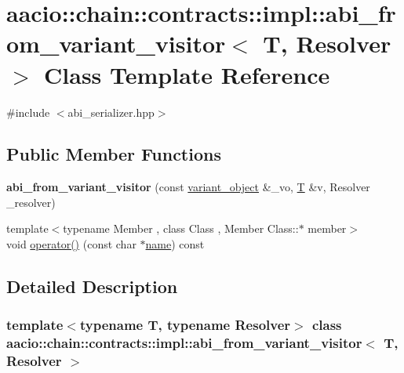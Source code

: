 \hypertarget{classaacio_1_1chain_1_1contracts_1_1impl_1_1abi__from__variant__visitor}{}\section{aacio\+:\+:chain\+:\+:contracts\+:\+:impl\+:\+:abi\+\_\+from\+\_\+variant\+\_\+visitor$<$ T, Resolver $>$ Class Template Reference}
\label{classaacio_1_1chain_1_1contracts_1_1impl_1_1abi__from__variant__visitor}


{\ttfamily \#include $<$abi\+\_\+serializer.\+hpp$>$}

\subsection*{Public Member Functions}
\begin{DoxyCompactItemize}
\item 
\mbox{\label{classaacio_1_1chain_1_1contracts_1_1impl_1_1abi__from__variant__visitor_aecbbe34012a4a713a79a01b68e327e52}} 
{\bfseries abi\+\_\+from\+\_\+variant\+\_\+visitor} (const \mbox{\hyperlink{classfc_1_1variant__object}{variant\+\_\+object}} \&\+\_\+vo, \mbox{\hyperlink{struct_t}{T}} \&v, Resolver \+\_\+resolver)
\item 
{\footnotesize template$<$typename Member , class Class , Member Class\+::$\ast$ member$>$ }\\void \mbox{\hyperlink{classaacio_1_1chain_1_1contracts_1_1impl_1_1abi__from__variant__visitor_a84172f51e3037e20703f1d15a71c7263}{operator()}} (const char $\ast$\mbox{\hyperlink{structaacio_1_1chain_1_1name}{name}}) const
\end{DoxyCompactItemize}


\subsection{Detailed Description}
\subsubsection*{template$<$typename T, typename Resolver$>$\newline
class aacio\+::chain\+::contracts\+::impl\+::abi\+\_\+from\+\_\+variant\+\_\+visitor$<$ T, Resolver $>$}

